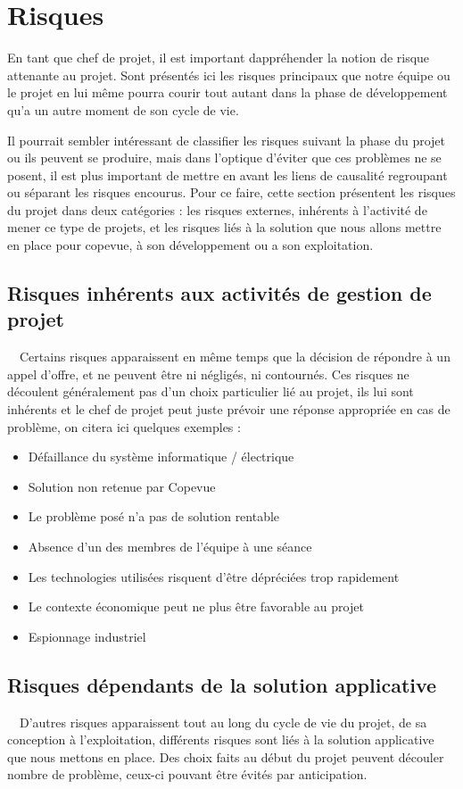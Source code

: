 \documentclass{mise_en_page}
\begin{document}
\section{Risques}
En tant que chef de projet, il est important
d{\textquotesingle}appréhender la notion de risque attenante au projet.
Sont présentés ici les risques principaux que notre équipe ou le projet
en lui même pourra courir tout autant dans la phase de développement
qu’a un autre moment de son cycle de vie.

Il pourrait sembler intéressant de classifier les risques suivant la
phase du projet ou ils peuvent se produire, mais dans l’optique
d’éviter que ces problèmes ne se posent, il est plus important de
mettre en avant les liens de causalité regroupant ou séparant les
risques encourus. Pour ce faire, cette section présentent les risques
du projet dans deux catégories : les risques externes, inhérents à
l’activité de mener ce type de projets, et les risques liés à la
solution que nous allons mettre en place pour copevue, à son
développement ou a son exploitation.

\subsection[Risques inhérents aux activités de gestion de
projet]{Risques inhérents aux activités de gestion de projet}
\ \ Certains risques apparaissent en même temps que la décision de
répondre à un appel d’offre, et ne peuvent être ni négligés, ni
contournés. Ces risques ne découlent généralement pas d’un choix
particulier lié au projet, ils lui sont inhérents et le chef de projet
peut juste prévoir une réponse appropriée en cas de problème, on citera
ici quelques exemples :

\begin{itemize}
\item Défaillance du système informatique / électrique
\item Solution non retenue par Copevue
\item Le problème posé n’a pas de solution rentable
\item Absence d’un des membres de l’équipe à une séance
\item Les technologies utilisées risquent d’être dépréciées trop
rapidement
\item Le contexte économique peut ne plus être favorable au projet
\item Espionnage industriel
\end{itemize}
\subsection[Risques dépendants de la solution applicative]{Risques
dépendants de la solution applicative}
\ \ D’autres risques apparaissent tout au long du cycle de vie du
projet, de sa conception à l’exploitation, différents risques sont liés
à la solution applicative que nous mettons en place. Des choix faits au
début du projet peuvent découler nombre de problème, ceux-ci pouvant
être évités par anticipation.
\end{document}
